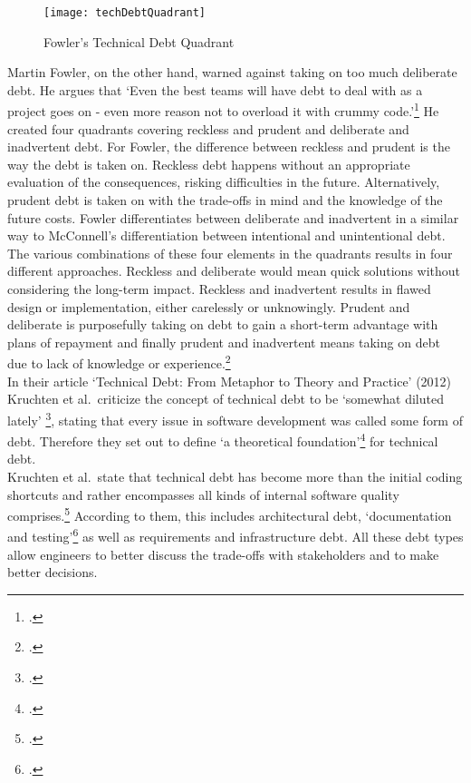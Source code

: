 \begin{figure}[H]
    \centering
    \caption{Fowler's Technical Debt Quadrant}
    \label{fig:technicaldebtquadrant}
    \texttt{[image: techDebtQuadrant]}
    \\
    \cite{fowlerTechnicalDebtQuadrant2009}
\end{figure}
Martin Fowler, on the other hand, warned against taking on too much deliberate debt. He argues that `Even the best teams will have debt to deal with as a project goes on - even more reason not to overload it with crummy code.'\footcite{fowlerTechnicalDebtQuadrant2009}
He created four quadrants covering reckless and prudent and deliberate and inadvertent debt. For Fowler, the difference between reckless and prudent is the way the debt is taken on. Reckless debt happens without an appropriate evaluation of the consequences, risking difficulties in the future. Alternatively, prudent debt is taken on
with the trade-offs in mind and the knowledge of the future costs. Fowler differentiates between deliberate and inadvertent in a similar way to McConnell's differentiation between intentional and unintentional debt.
The various combinations of these four elements in the quadrants results in four different approaches. Reckless and deliberate would mean quick solutions without considering the long-term impact. Reckless and inadvertent results in flawed design or implementation, either carelessly or unknowingly. 
Prudent and deliberate is purposefully taking on debt to gain a short-term advantage with plans of repayment and finally prudent and inadvertent means taking on debt due to lack of knowledge or experience.\footcite{fowlerTechnicalDebtQuadrant2009}\\

In their article `Technical Debt: From Metaphor to Theory and Practice' (2012) Kruchten et al.\ criticize the concept of technical debt to be `somewhat diluted lately' \footcite[18]{kruchtenTechnicalDebtMetaphor2012}, stating that every issue in software development was called some form of debt. 
Therefore they set out to define `a theoretical foundation'\footcite[19]{kruchtenTechnicalDebtMetaphor2012} for technical debt.\\
Kruchten et al.\ state that technical debt has become more than the initial coding shortcuts and rather encompasses all kinds of internal software quality comprises.\footcite[19]{kruchtenTechnicalDebtMetaphor2012}
According to them, this includes architectural debt, `documentation and testing'\footcite[20]{kruchtenTechnicalDebtMetaphor2012} as well as requirements and infrastructure debt.
All these debt types allow engineers to better discuss the trade-offs with stakeholders and to make better decisions.\\

